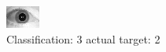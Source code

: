 \begin{figure}[h!]
\begin{center}
\includegraphics[width=0.60\columnwidth]{figures/ID1734_class_3_target_2.png}
\end{center}
\caption{ Classification: 3 actual target: 2}
\label{fig:ID1734_class_3_target_2}
\end{figure}
